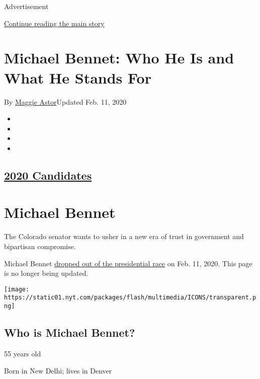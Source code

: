 Advertisement

\protect\hyperlink{after-top}{Continue reading the main story}

\hypertarget{michael-bennet-who-he-is-and-what-he-stands-for}{%
\section{Michael Bennet: Who He Is and What He Stands
For}\label{michael-bennet-who-he-is-and-what-he-stands-for}}

By \href{https://www.nytimes.com/by/maggie-astor}{Maggie Astor}Updated
Feb. 11, 2020

\begin{itemize}
\item
\item
\item
\item
\end{itemize}

\hypertarget{2020-candidates}{%
\subsection{\texorpdfstring{\href{https://www.nytimes.com/interactive/2019/us/politics/2020-presidential-candidates.html}{2020
Candidates}}{2020 Candidates}}\label{2020-candidates}}

\hypertarget{michael-bennet}{%
\section{Michael Bennet}\label{michael-bennet}}

The Colorado senator wants to usher in a new era of trust in government
and bipartisan compromise.

Michael Bennet
\href{https://www.nytimes.com/2020/02/11/us/politics/michael-bennet-drops-out.html}{dropped
out of the presidential race} on Feb. 11, 2020. This page is no longer
being updated.

\texttt{[image: https://static01.nyt.com/packages/flash/multimedia/ICONS/transparent.png]}

\hypertarget{who-is-michael-bennet}{%
\subsection{Who is Michael Bennet?}\label{who-is-michael-bennet}}

55 years old

Born in New Delhi; lives in Denver

